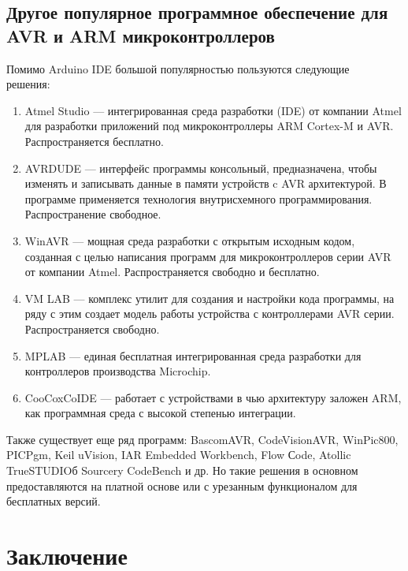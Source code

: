 \documentclass[12pt, oneside]{altsu-report}
\begin{document}
\section{Другое популярное программное обеспечение для AVR и ARM микроконтроллеров}

Помимо Arduino IDE большой популярностью пользуются следующие решения:~\cite{MK}~\cite{MK_2}

\begin{enumerate}
    \item Atmel Studio --- интегрированная среда разработки (IDE) от компании Atmel для разработки приложений под микроконтроллеры ARM Cortex-M и AVR. Распространяется бесплатно.
    
    \item AVRDUDE --- интерфейс программы консольный, предназначена, чтобы изменять и записывать данные в памяти устройств c AVR архитектурой. В программе применяется технология внутрисхемного программирования. Распространение свободное.
    
    \item WinAVR --- мощная среда разработки с открытым исходным кодом, созданная с целью написания программ для микроконтроллеров серии AVR от компании Atmel. Распространяется свободно и бесплатно.
    
    \item VM LAB --- комплекс утилит для создания и настройки кода программы, на ряду с этим создает модель работы устройства с контроллерами AVR серии. Распространяется свободно.
    
    \item MPLAB --- единая бесплатная интегрированная среда разработки для контроллеров производства Microchip.
    
    \item CooCoxCoIDE --- работает с устройствами в чью архитектуру заложен ARM, как программная среда с высокой степенью интеграции.
\end{enumerate}

Также существует еще ряд программ: BascomAVR, CodeVisionAVR, WinPic800, PICPgm, Keil uVision, IAR Embedded Workbench, Flow Сode, Atollic TrueSTUDIOб Sourcery CodeBench и др. Но такие решения в основном предоставляются на платной основе или с урезанным функционалом для бесплатных версий.

\chapter*{Заключение}
\end{document}
